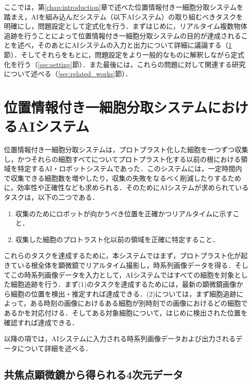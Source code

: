 \thispagestyle{fancy2}

ここでは，第\ref{chap:introduction}章で述べた位置情報付き一細胞分取システムを踏まえ，AIを組み込んだシステム（以下AIシステム）の取り組むべきタスクを明確にし，問題設定として定式化を行う．まずはじめに，リアルタイム複数物体追跡を行うことによって位置情報付き一細胞分取システムの目的が達成されることを述べ，そのあとにAIシステムの入力と出力について詳細に議論する（\ref{sec:ai_system}節）．そしてそれらをもとに，問題設定をより一般的なものに解釈しながら定式化を行う（\ref{sec:setting}節）．また最後には，これらの問題に対して関連する研究について述べる（\ref{sec:related_works}節）．

\section{位置情報付き一細胞分取システムにおけるAIシステム}

\label{sec:ai_system}
位置情報付き一細胞分取システムは，プロトプラスト化した細胞を一つずつ収集し，かつそれらの細胞すべてについてプロトプラスト化する以前の根における領域を特定するAI・ロボットシステムであった．このシステムには，一定時間内で収集できる細胞数を増やしたり，収集の失敗をなるべく削減したりするために，効率性や正確性なども求められる．そのためにAIシステムが求められているタスクは，以下の二つである．
\begin{enumerate}[label=(\arabic*)]
    \item 収集のためにロボットが向かうべき位置を正確かつリアルタイムに示すこと．
    \item 収集した細胞のプロトラスト化以前の領域を正確に特定すること．
\end{enumerate}

これらのタスクを達成するために，本システムではまず，プロトプラスト化が起きている根全体を顕微鏡でリアルタイム撮影し，時系列画像データを得る．そしてこの時系列画像データを入力として，AIシステムではすべての細胞を対象とした細胞追跡を行う．まず(1)のタスクを達成するためには，最新の顕微鏡画像から細胞の位置を検出・推定すれば達成できる．(2)については，まず細胞追跡によって，ある時刻の画像におけるある細胞が別時刻での画像におけるどの細胞であるかを対応付ける．そしてある対象細胞について，はじめに検出された位置を確認すれば達成できる．

以降の項では，AIシステムに入力される時系列画像データおよび出力されるデータについて詳細を述べる．

    \subsection{共焦点顕微鏡から得られる4次元データ}
    \label{sec:}

